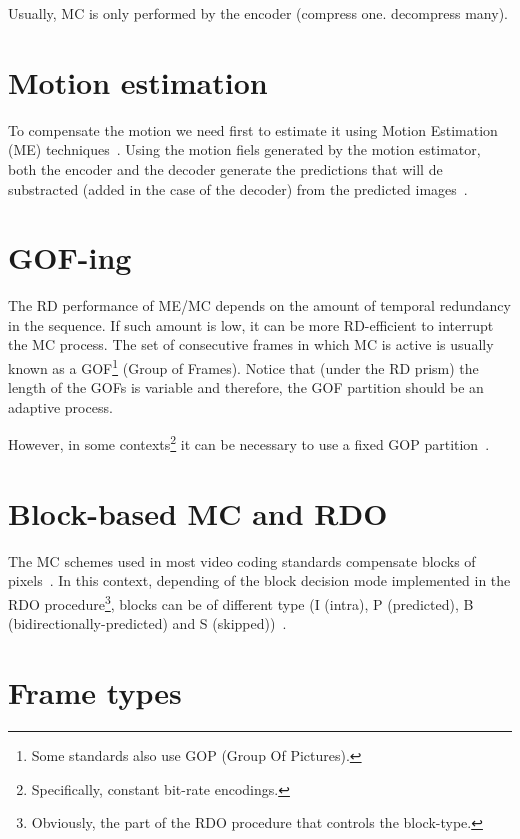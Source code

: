 Usually, MC is only performed by the encoder (compress one. decompress
many).


\section{Motion estimation}

To compensate the motion we need first to estimate it using Motion
Estimation (ME) techniques~\cite{vruiz__ME}. Using the motion fiels
generated by the motion estimator, both the encoder and the decoder
generate the predictions that will de substracted (added in the case
of the decoder) from the predicted images~\cite{vruiz__MC}.


\section{GOF-ing}

The RD performance of ME/MC depends on the amount of temporal
redundancy in the sequence. If such amount is low, it can be more
RD-efficient to interrupt the MC process. The set of consecutive
frames in which MC is active is usually known as a GOF\footnote{Some
  standards also use GOP (Group Of Pictures).} (Group of
Frames). Notice that (under the RD prism) the length of the GOFs is
variable and therefore, the GOF partition should be an adaptive
process.

However, in some contexts\footnote{Specifically, constant bit-rate
encodings.} it can be necessary to use a fixed GOP
partition~\cite{vruiz__MC}.

\section{Block-based MC and RDO}

The MC schemes used in most video coding standards compensate blocks
of pixels~\cite{vruiz__ME}. In this context, depending of the block
decision mode implemented in the RDO procedure\footnote{Obviously, the
  part of the RDO procedure that controls the block-type.}, blocks can
be of different type (I (intra), P (predicted), B
(bidirectionally-predicted) and S (skipped))~\cite{vruiz__MC}.

\section{Frame types}

